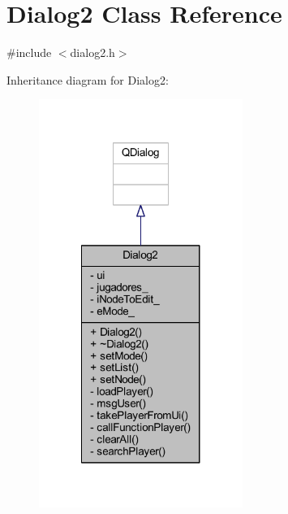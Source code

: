 \hypertarget{class_dialog2}{}\section{Dialog2 Class Reference}
\label{class_dialog2}


{\ttfamily \#include $<$dialog2.\+h$>$}



Inheritance diagram for Dialog2\+:\nopagebreak
\begin{figure}[H]
\begin{center}
\leavevmode
\includegraphics[width=188pt]{de/d29/class_dialog2__inherit__graph}
\end{center}
\end{figure}


